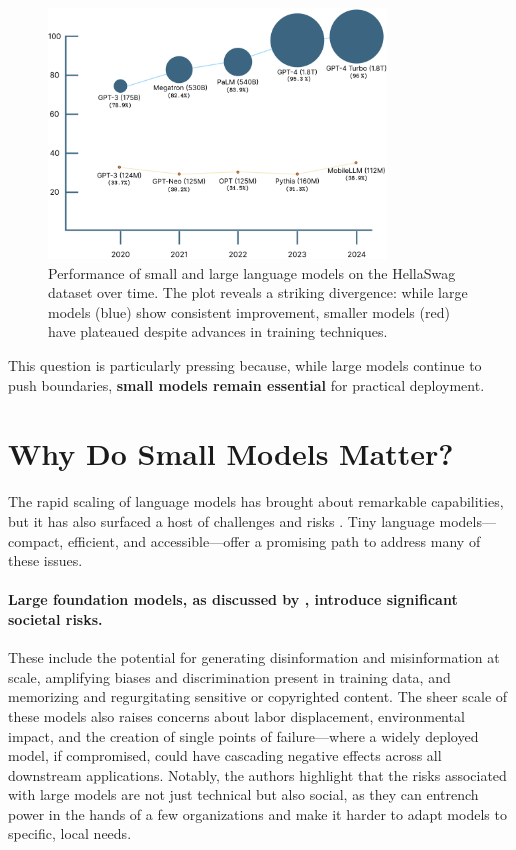 \begin{figure}[htbp]
    \centering
    \includegraphics[width=0.8\textwidth]{chapters/introduction/figures/lm_performance_comparison.pdf}
    \caption{Performance of small and large language models on the HellaSwag dataset over time. The plot reveals a striking divergence: while large models (blue) show consistent improvement, smaller models (red) have plateaued despite advances in training techniques.}
    \label{fig:model_size_vs_performance}
\end{figure}

This question is particularly pressing because, while large models continue to push boundaries, \textbf{small models remain essential} for practical deployment. 

\section{Why Do Small Models Matter?}

The rapid scaling of language models has brought about remarkable capabilities, but it has also surfaced a host of challenges and risks \citep{bommasani2021foundation}. Tiny language models—compact, efficient, and accessible—offer a promising path to address many of these issues.

\paragraph{Large foundation models, as discussed by \citet{bommasani2021foundation}, introduce significant societal risks.} These include the potential for generating disinformation and misinformation at scale, amplifying biases and discrimination present in training data, and memorizing and regurgitating sensitive or copyrighted content. The sheer scale of these models also raises concerns about labor displacement, environmental impact, and the creation of single points of failure—where a widely deployed model, if compromised, could have cascading negative effects across all downstream applications. Notably, the authors highlight that the risks associated with large models are not just technical but also social, as they can entrench power in the hands of a few organizations and make it harder to adapt models to specific, local needs.

